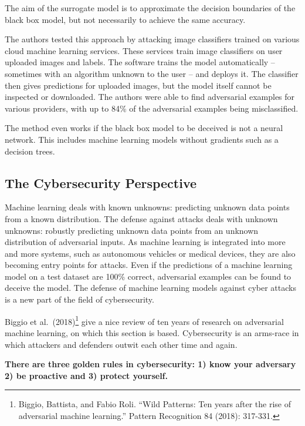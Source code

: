 \documentclass[
  11pt,
]{scrbook}
\begin{document}
The aim of the surrogate model is to approximate the decision boundaries of the black box model, but not necessarily to achieve the same accuracy.

The authors tested this approach by attacking image classifiers trained on various cloud machine learning services.
These services train image classifiers on user uploaded images and labels.
The software trains the model automatically -- sometimes with an algorithm unknown to the user -- and deploys it.
The classifier then gives predictions for uploaded images, but the model itself cannot be inspected or downloaded.
The authors were able to find adversarial examples for various providers, with up to 84\% of the adversarial examples being misclassified.

The method even works if the black box model to be deceived is not a neural network.
This includes machine learning models without gradients such as a decision trees.

\hypertarget{the-cybersecurity-perspective}{%
\subsection{The Cybersecurity Perspective}\label{the-cybersecurity-perspective}}

Machine learning deals with known unknowns: predicting unknown data points from a known distribution.
The defense against attacks deals with unknown unknowns: robustly predicting unknown data points from an unknown distribution of adversarial inputs.
As machine learning is integrated into more and more systems, such as autonomous vehicles or medical devices, they are also becoming entry points for attacks.
Even if the predictions of a machine learning model on a test dataset are 100\% correct, adversarial examples can be found to deceive the model.
The defense of machine learning models against cyber attacks is a new part of the field of cybersecurity.

Biggio et al.~(2018)\footnote{Biggio, Battista, and Fabio Roli. ``Wild Patterns: Ten years after the rise of adversarial machine learning.'' Pattern Recognition 84 (2018): 317-331.} give a nice review of ten years of research on adversarial machine learning, on which this section is based.
Cybersecurity is an arms-race in which attackers and defenders outwit each other time and again.

\textbf{There are three golden rules in cybersecurity: 1) know your adversary 2) be proactive and 3) protect yourself.}
\end{document}
